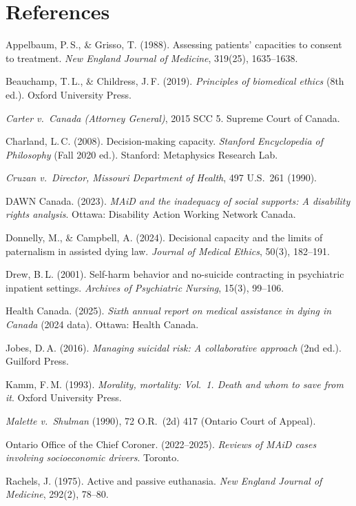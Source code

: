 \documentclass[11pt, letterpaper]{article}
\begin{document}
\bigskip
\section*{References}
\setlength{\parskip}{5pt}
\setlength{\parindent}{0pt}
\small

Appelbaum, P.\,S., \& Grisso, T. (1988). Assessing patients' capacities to consent to
treatment. \textit{New England Journal of Medicine}, 319(25), 1635--1638.

Beauchamp, T.\,L., \& Childress, J.\,F. (2019). \textit{Principles of biomedical ethics}
(8th ed.). Oxford University Press.

\textit{Carter v.\ Canada (Attorney General)}, 2015 SCC 5. Supreme Court of Canada.

Charland, L.\,C. (2008). Decision-making capacity.
\textit{Stanford Encyclopedia of Philosophy} (Fall 2020 ed.).
Stanford: Metaphysics Research Lab.

\textit{Cruzan v.\ Director, Missouri Department of Health}, 497 U.S.\ 261 (1990).

DAWN Canada. (2023). \textit{MAiD and the inadequacy of social supports:
A disability rights analysis}. Ottawa: Disability Action Working Network Canada.

Donnelly, M., \& Campbell, A. (2024). Decisional capacity and the limits of
paternalism in assisted dying law. \textit{Journal of Medical Ethics}, 50(3), 182--191.

Drew, B.\,L. (2001). Self-harm behavior and no-suicide contracting in psychiatric
inpatient settings. \textit{Archives of Psychiatric Nursing}, 15(3), 99--106.

Health Canada. (2025). \textit{Sixth annual report on medical assistance in dying in
Canada} (2024 data). Ottawa: Health Canada.

Jobes, D.\,A. (2016). \textit{Managing suicidal risk: A collaborative approach}
(2nd ed.). Guilford Press.

Kamm, F.\,M. (1993). \textit{Morality, mortality: Vol.~1. Death and whom to save from it}.
Oxford University Press.

\textit{Malette v.\ Shulman} (1990), 72 O.R.\ (2d) 417 (Ontario Court of Appeal).

Ontario Office of the Chief Coroner. (2022--2025).
\textit{Reviews of MAiD cases involving socioeconomic drivers}. Toronto.

Rachels, J. (1975). Active and passive euthanasia.
\textit{New England Journal of Medicine}, 292(2), 78--80.
\end{document}
